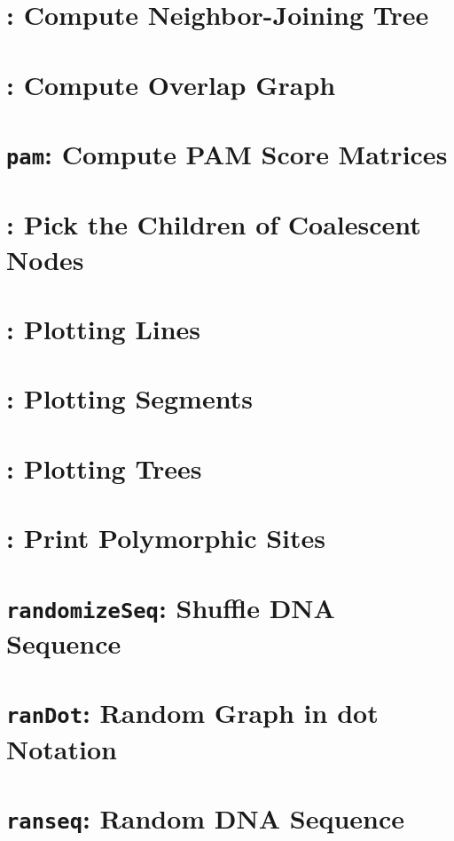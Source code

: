 \documentclass[a4paper]{book}
\begin{document}
\chapter{: Compute Neighbor-Joining Tree}\label{ch:nj}

\chapter{: Compute Overlap Graph}\label{ch:olga}

\chapter{\texttt{pam}: Compute PAM Score
  Matrices}\label{ch:pam}

\chapter{: Pick the Children of Coalescent
  Nodes}\label{ch:pc}

\chapter{: Plotting Lines}\label{ch:pl}

\chapter{: Plotting Segments}\label{ch:ps}

\chapter{: Plotting Trees}\label{ch:pt}

\chapter{: Print Polymorphic Sites}\label{ch:pp}

\chapter{\texttt{randomizeSeq}: Shuffle DNA
  Sequence}\label{ch:rs}

\chapter{\texttt{ranDot}: Random Graph in dot Notation}\label{ch:rd}

\chapter{\texttt{ranseq}: Random DNA Sequence}\label{ch:ran}

\end{document}
